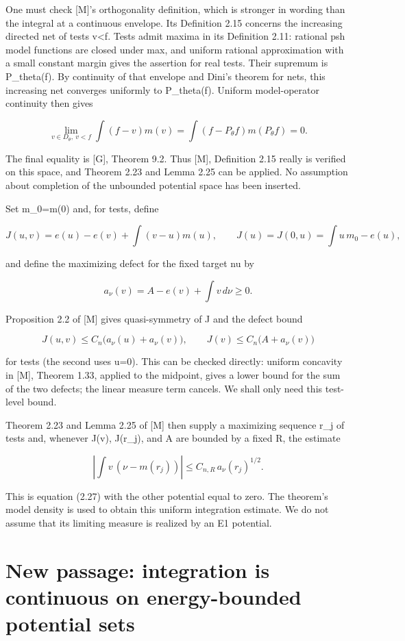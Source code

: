 \documentclass[11pt]{article}
\begin{document}
One must check [M]'s orthogonality definition, which is stronger in wording than the integral at a continuous envelope. Its Definition 2.15 concerns the increasing directed net of tests v\textless{}f. Tests admit maxima in its Definition 2.11: rational psh model functions are closed under max, and uniform rational approximation with a small constant margin gives the assertion for real tests. Their supremum is P\_theta(f). By continuity of that envelope and Dini's theorem for nets, this increasing net converges uniformly to P\_theta(f). Uniform model-operator continuity then gives

\[
\lim_{v\in D_\theta,\ v<f}\int(f-v)m(v)
=\int(f-P_\theta f)m(P_\theta f)=0.
\]

The final equality is [G], Theorem 9.2. Thus [M], Definition 2.15 really is verified on this space, and Theorem 2.23 and Lemma 2.25 can be applied. No assumption about completion of the unbounded potential space has been inserted.

Set m\_0=m(0) and, for tests, define

\[
J(u,v)=e(u)-e(v)+\int(v-u)m(u),\qquad
J(u)=J(0,u)=\int u\,m_0-e(u),
\]

and define the maximizing defect for the fixed target nu by

\[
a_\nu(v)=A-e(v)+\int v\,d\nu\geq0.
\]

Proposition 2.2 of [M] gives quasi-symmetry of J and the defect bound

\[
J(u,v)\leq C_n\bigl(a_\nu(u)+a_\nu(v)\bigr),\qquad
J(v)\leq C_n\bigl(A+a_\nu(v)\bigr)
\]

for tests (the second uses u=0). This can be checked directly: uniform concavity in [M], Theorem 1.33, applied to the midpoint, gives a lower bound for the sum of the two defects; the linear measure term cancels. We shall only need this test-level bound.

Theorem 2.23 and Lemma 2.25 of [M] then supply a maximizing sequence r\_j of tests and, whenever J(v), J(r\_j), and A are bounded by a fixed R, the estimate

\[
\left|\int v\,(\nu-m(r_j))\right|
\leq C_{n,R}\,a_\nu(r_j)^{1/2}.
\]

This is equation (2.27) with the other potential equal to zero. The theorem's model density is used to obtain this uniform integration estimate. We do not assume that its limiting measure is realized by an E1 potential.

\section{New passage: integration is continuous on energy-bounded potential sets}
\end{document}
